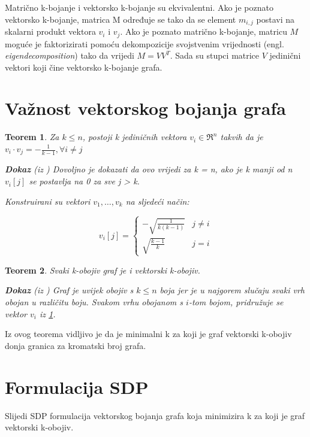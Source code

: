 \documentclass[diplomskirad]{fer}
\newtheorem{theorem}{Teorem}[chapter]
\begin{document}
Matrično k-bojanje i vektorsko k-bojanje su ekvivalentni. Ako je poznato vektorsko k-bojanje, matrica M određuje se tako da se
element $m_{i,j}$ postavi na skalarni produkt vektora $v_i$ i $v_j$. Ako je poznato matrično k-bojanje, matricu $M$ moguće je faktorizirati
pomoću dekompozicije svojstvenim vrijednosti (engl. \textit{eigendecomposition}) tako da vrijedi $M = VV^T$. Sada su stupci matrice $V$ jedinični
vektori koji čine vektorsko k-bojanje grafa. \cite{karger1998approximategraphcoloringsemidefinite}

\section{Važnost vektorskog bojanja grafa}
\begin{theorem}\label{teorem1}
  Za $k \leq n$, postoji k jediničnih vektora $v_i \in \Re^n$ takvih da je $v_i \cdot v_j = -\frac{1}{k-1}, \forall i \neq j$ 

  \textbf{Dokaz} (iz \cite{karger1998approximategraphcoloringsemidefinite}) Dovoljno je dokazati da ovo vrijedi za k = n, ako je k manji od n
  $v_{i}[j]$ se postavlja na 0 za sve j > k.

  Konstruirani su vektori $v_1, \dots, v_k$ na sljedeći način:

  \begin{equation}
    v_i[j] = \begin{cases} -\sqrt{\frac{1}{k(k-1)}} & j \neq i \\ \sqrt{\frac{k-1}{k}} & j = i \end{cases}
  \end{equation}
\end{theorem}

\begin{theorem}
  Svaki k-obojiv graf je i vektorski k-obojiv.

  \textbf{Dokaz} (iz \cite{karger1998approximategraphcoloringsemidefinite}) Graf je uvijek obojiv s $k \leq n$ boja jer je u najgorem slučaju
  svaki vrh obojan u različitu boju. Svakom vrhu obojanom s $i$-tom bojom, pridružuje se vektor $v_i$ iz \ref{teorem1}.
\end{theorem}

Iz ovog teorema vidljivo je da je minimalni k za koji je graf vektorski k-obojiv donja granica za kromatski broj grafa.

\section{Formulacija SDP}
Slijedi SDP formulacija vektorskog bojanja grafa koja minimizira k za koji je graf vektorski k-obojiv.
\end{document}
